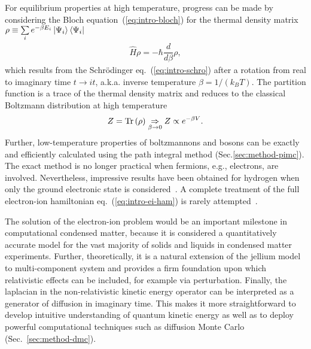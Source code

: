 For equilibrium properties at high temperature, progress can be made by considering the Bloch equation~(\ref{eq:intro-bloch}) for the thermal density matrix $\rho\equiv\sum\limits_i e^{-\beta E_i} \ket{\Psi_i}\bra{\Psi_i}$
\begin{align} \label{eq:intro-bloch}
\hat{H} \rho = -\hbar\dfrac{d}{d\beta}\rho,
\end{align}
which results from the Schr\"odinger eq.~(\ref{eq:intro-schro}) after a rotation from real to imaginary time $t\rightarrow it$, a.k.a. inverse temperature $\beta=1/(k_BT)$.
The partition function is a trace of the thermal density matrix and reduces to the classical Boltzmann distribution at high temperature
\begin{align}
Z=\text{Tr}\left(\rho\right) \underset{\beta\rightarrow 0}{\Rightarrow} Z \propto e^{-\beta V}.
\end{align}
Further, low-temperature properties of boltzmannons and bosons can be exactly and efficiently calculated using the path integral method (Sec.\ref{sec:method-pimc}). The exact method is no longer practical when fermions, e.g., electrons, are involved. Nevertheless, impressive results have been obtained for hydrogen when only the ground electronic state is considered~\cite{Pierleoni2016b,Celliers2018}.
A complete treatment of the full electron-ion hamiltonian eq.~(\ref{eq:intro-ei-ham}) is rarely attempted~\cite{Ceperley1981,Natoli1995}.

The solution of the electron-ion problem would be an important milestone in computational condensed matter, because it is considered a quantitatively accurate model for the vast majority of solids and liquids in condensed matter experiments. Further, theoretically, it is a natural extension of the jellium model to multi-component system and provides a firm foundation upon which relativistic effects can be included, for example via perturbation. Finally, the laplacian in the non-relativistic kinetic energy operator can be interpreted as a generator of diffusion in imaginary time. This makes it more straightforward to develop intuitive understanding of quantum kinetic energy as well as to deploy powerful computational techniques such as diffusion Monte Carlo (Sec.~\ref{sec:method-dmc}).

